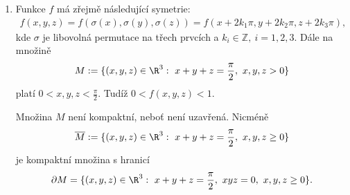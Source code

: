 \documentclass[answers]{exam}
\begin{document}
\begin{questions}
\begin{solution}
\begin{enumerate}[label=(\roman*)]
				Nyn\'i spo\v cteme gradienty
				$$\nabla f(x,y)=\bigg(\frac{1}{a},\frac{1}{b}\bigg),\ \ \nabla g(x,y)=(2x,2y).$$
				Podle v\v ety o Lagrangeov\'ych multiplik\'atorech mus\'i v bod\v e extr\'emu $(x_0,y_0)\in K$ platit
				$$(\nabla f)(x_0,y_0)=\lambda(\nabla g)(x_0,y_0)$$
				pro n\v ejak\'e $\lambda\in\R$. To vede na soustavu line\'arn\'ich rovnic:
				\begin{align*}
				2\lambda x_0&=\frac{1}{a},\ 2\lambda y_0=\frac{1}{b}.
				\end{align*}
				Vid\'ime, \v ze nutn\v e $x_0\ne0$ a $y_0\ne0$. Z prvn\'i rovnice tedy plyne $\lambda=\frac{1}{2ax_0}$ a dosazen\'im do druh\'e rovnice dostaneme:
				$$y_0=\frac{1}{2\lambda b}=\frac{2ax_0}{2b}=\frac{ax_0}{b}.$$
				D\'ale mus\'i platit $x_0^2+y_0^2=1$ a tedy
				\begin{align*}
				1= x_0^2+\bigg(\frac{ax_0}{b}\bigg)^2=&x_0^2(1+\frac{a^2}{b^2})=\frac{x_0^2}{b^2}(a^2+b^2)\Leftrightarrow x_0=\frac{\pm b}{\sqrt{a^2+b^2}},\ y=\frac{\pm a}{\sqrt{a^2+b^2}}.
				\end{align*}
				Ozna\v cme
				$$A:=\mathrm{sign}(ab)\bigg(\frac{b}{\sqrt{a^2+b^2}},\ \frac{a}{\sqrt{a^2+b^2}}\bigg).$$
				Pak
				\begin{align*}
				f(\pm A)&=\frac{\mathrm{sign}(ab)}{\sqrt{a^2+b^2}}\bigg(\frac{\pm b}{a}+\frac{\pm a}{b}\bigg)\\
				&=\frac{\mathrm{sign}(ab)}{\sqrt{a^2+b^2}}\bigg(\frac{\pm (b^2+ a^2)}{ab}\bigg)\\
				&=\sqrt{a^2+b^2}\bigg(\frac{\pm 1}{|ab|}\bigg).
				\end{align*}
				
				Z\'av\v er: $f$ nab\'yv\'a glob\'aln\'iho maxima v bod\v e $A$ a glob\'aln\'iho minima v bod\v e $-A$.
				
			\item 
				
				Funkce $f$ m\'a z\v rejm\v e n\'asleduj\'ic\'i symetrie:
				\begin{align*}
				f(x,y,z)=f(\sigma(x),\sigma(y),\sigma(z))=f(x+2k_1\pi,y+2k_2\pi,z+2k_3\pi), 
				\end{align*}
				kde $\sigma$ je libovoln\'a permutace na t\v rech prvc\'ich a $k_i\in\mathbb Z,\ i=1,2,3$. D\'ale na mno\v zin\v e 
				$$M:=\{(x,y,z) \in \R^3:\ x+y+z=\frac{\pi}{2},\ x,y,z>0\}$$
				plat\'i $0<x,y,z<\frac{\pi}{2}$.
				Tud\'i\v z $0<f(x,y,z)<1.$
				
				Mno\v zina $M$ nen\'i kompaktn\'i, nebo\v t nen\'i uzav\v ren\'a. Nicm\'en\v e 
				$$\overline M:=\{(x,y,z) \in \R^3:\ x+y+z=\frac{\pi}{2},\ x,y,z\ge0\}$$
				je kompaktn\'i mno\v zina s hranic\'i 
				$$\partial M=\{(x,y,z) \in \R^3:\ x+y+z=\frac{\pi}{2},\ xyz=0,\ x,y,z\ge0\}.$$
				

\end{enumerate}
\end{solution}
\end{questions}
\end{document}
